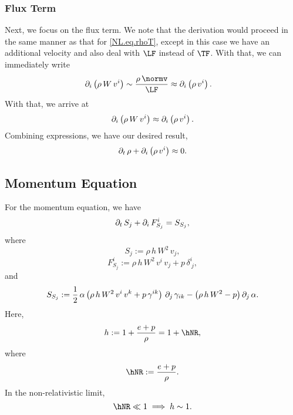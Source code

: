 \subsubsection{Flux Term}
Next, we focus on the flux term.
We note that the derivation would proceed in the same manner as that for
\eqref{NL.eq.rhoT}, except in this case we have an additional velocity
and also deal with $\LF$ instead of $\TF$.
With that, we can immediately write
\begin{align}
  \p_{i}\left(\rho\,W\,v^{i}\right)
  &\sim\frac{\rho\,\normv}{\LF}\approx\p_{i}\left(\rho\,v^{i}\right).
\end{align}
With that, we arrive at
\begin{equation}
  \partial_{i}\left(\rho\,W\,v^{i}\right)
  \approx\partial_{i}\left(\rho\,v^{i}\right).
\end{equation}
Combining expressions, we have our desired result,
\begin{equation}
  \partial_{t}\,\rho+\partial_{i}\left(\rho\,v^{i}\right)\approx0.
\end{equation}

\subsection{Momentum Equation}

For the momentum equation, we have
\begin{equation}
  \partial_{t}\,S_{j}+\partial_{i}\,F^{i}_{S_{j}}=S_{S_{j}},
\end{equation}
where
\begin{equation}
  S_{j}:=\rho\,h\,W^{2}\,v_{j},
\end{equation}
\begin{equation}
  F^{i}_{S_{j}}
  :=\rho\,h\,W^{2}\,v^{i}\,v_{j}+p\,\delta^{i}_{~j},
\end{equation}
and
\begin{equation}
  S_{S_{j}}
  :=\frac{1}{2}\,\alpha
  \left(\rho\,h\,W^{2}\,v^{i}\,v^{k}+p\,\gamma^{ik}\right)\,
  \partial_{j}\,\gamma_{ik}-\left(\rho\,h\,W^{2}-p\right)\partial_{j}\,\alpha.
\end{equation}
Here,
\begin{equation}
  h:=1+\frac{e+p}{\rho}=1+\hNR,
\end{equation}
where
\begin{equation}
  \hNR:=\frac{e+p}{\rho}.
\end{equation}
In the non-relativistic limit,
\begin{equation}
  \hNR\ll1\implies h\sim1.
\end{equation}


